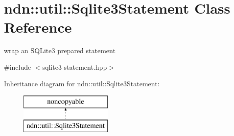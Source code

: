 \hypertarget{classndn_1_1util_1_1Sqlite3Statement}{}\section{ndn\+:\+:util\+:\+:Sqlite3\+Statement Class Reference}
\label{classndn_1_1util_1_1Sqlite3Statement}


wrap an S\+Q\+Lite3 prepared statement  




{\ttfamily \#include $<$sqlite3-\/statement.\+hpp$>$}

Inheritance diagram for ndn\+:\+:util\+:\+:Sqlite3\+Statement\+:\begin{figure}[H]
\begin{center}
\leavevmode
\includegraphics[height=2.000000cm]{classndn_1_1util_1_1Sqlite3Statement}
\end{center}
\end{figure}

